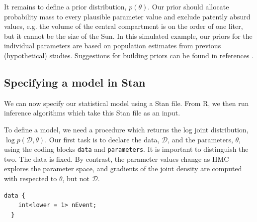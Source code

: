It remains to define a prior distribution, $p(\theta)$.
Our prior should allocate probability mass to every plausible parameter value and exclude patently absurd values, e.g. the volume of the central compartment is on the order of one liter, but it cannot be the size of the Sun.
In this simulated example, our priors for the individual parameters are based on population estimates from previous (hypothetical) studies.
Suggestions for building priors can be found in references \cite{Gabry:2017, Betancourt:2020, author:0000}.

\subsection{Specifying a model in Stan}

We can now specify our statistical model using a Stan file.
From R, we then run inference algorithms which take this Stan file as an input.

To define a model, we need a procedure which returns the log joint distribution, $\log p(\mathcal D, \theta)$.
Our first task is to declare the data, $\mathcal D$, and the parameters, $\theta$, using the coding blocks \texttt{data} and \texttt{parameters}.
It is important to distinguish the two.
The data is fixed.
By contrast, the parameter values change as HMC explores the parameter space, and gradients of the joint density are computed with respected to $\theta$, but not $\mathcal D$.

\begin{lstlisting}[style=stan, numbers=none] 
  data {
    int<lower = 1> nEvent; 
  }
 
\end{lstlisting}
